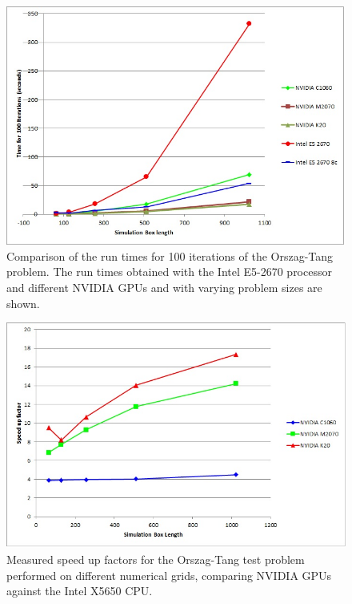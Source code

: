 
\begin{figure}[h]
\includegraphics[scale=0.7]{figure9_e52670_timings.JPG}
\caption{Comparison of the run times for 100 iterations of the Orszag-Tang problem. The run times obtained with the Intel E5-2670 processor and different NVIDIA GPUs and with varying problem sizes are shown.}
\end{figure}





\begin{figure}[h]
\includegraphics[scale=0.7]{fig10_x5650.JPG}
\caption{Measured speed up factors for the Orszag-Tang test problem performed on different numerical grids, comparing NVIDIA GPUs against the Intel X5650 CPU.}
\end{figure}



